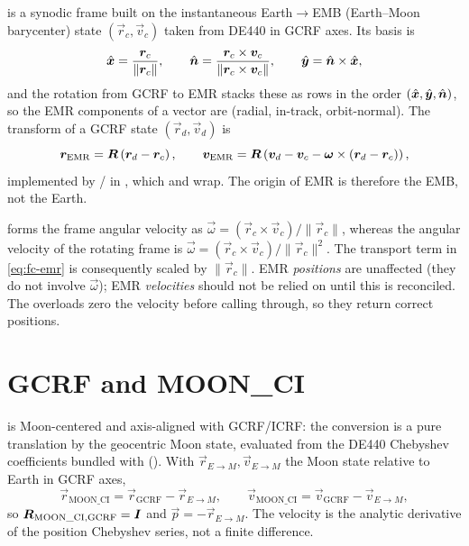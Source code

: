  is a synodic frame built on the instantaneous Earth$\to$EMB
(Earth--Moon barycenter) state $(\vec{r}_c, \vec{v}_c)$ taken from DE440 in
GCRF axes. Its basis is
%
\begin{equation}
  \label{eq:fc-emr-basis}
  \hat{\bm{x}} = \frac{\bm{r}_c}{\lVert\bm{r}_c\rVert},
  \qquad
  \hat{\bm{n}} = \frac{\bm{r}_c\times\bm{v}_c}{\lVert\bm{r}_c\times\bm{v}_c\rVert},
  \qquad
  \hat{\bm{y}} = \hat{\bm{n}}\times\hat{\bm{x}},
\end{equation}
%
and the rotation from GCRF to EMR stacks these as rows in the order
$(\hat{\bm{x}}, \hat{\bm{y}}, \hat{\bm{n}})$, so the EMR components of a vector are
(radial, in-track, orbit-normal). The transform of a GCRF state
$(\vec{r}_d,\vec{v}_d)$ is
%
\begin{equation}
  \label{eq:fc-emr}
  \bm{r}_{\mathrm{EMR}} = \bm{R}\left(\bm{r}_d - \bm{r}_c\right),
  \qquad
  \bm{v}_{\mathrm{EMR}} = \bm{R}\left(\bm{v}_d - \bm{v}_c
    - \bm{\omega}\times\left(\bm{r}_d - \bm{r}_c\right)\right),
\end{equation}
%
implemented by  / in
, which  and
 wrap. The origin of EMR is therefore the EMB, not the Earth.

\begin{lupntwarning}
   forms the frame angular velocity as
  $\vec{\omega} = (\vec{r}_c\times\vec{v}_c)/\lVert\vec{r}_c\rVert$, whereas
  the angular velocity of the rotating frame is
  $\vec{\omega} = (\vec{r}_c\times\vec{v}_c)/\lVert\vec{r}_c\rVert^2$. The
  transport term in \cref{eq:fc-emr} is consequently scaled by
  $\lVert\vec{r}_c\rVert$. EMR \emph{positions} are unaffected (they do not
  involve $\vec{\omega}$); EMR \emph{velocities} should not be relied on
  until this is reconciled. The  overloads zero the velocity
  before calling through, so they return correct positions.
\end{lupntwarning}

\section{GCRF and MOON\_CI}
\label{sec:fc-moonci}

 is Moon-centered and axis-aligned with GCRF/ICRF: the
conversion is a pure translation by the geocentric Moon state, evaluated
from the DE440 Chebyshev coefficients \citep{park2021de440} bundled with
\lupnt{} (). With
$\vec{r}_{E\to M}, \vec{v}_{E\to M}$ the Moon state relative to Earth in
GCRF axes,
%
\begin{equation}
  \label{eq:fc-moonci}
  \vec{r}_{\mathrm{MOON\_CI}} = \vec{r}_{\mathrm{GCRF}} - \vec{r}_{E\to M},
  \qquad
  \vec{v}_{\mathrm{MOON\_CI}} = \vec{v}_{\mathrm{GCRF}} - \vec{v}_{E\to M},
\end{equation}
%
so $\bm{R}_{\mathrm{MOON\_CI},\mathrm{GCRF}} = \bm{I}$ and
$\vec{p} = -\vec{r}_{E\to M}$. The velocity is the analytic derivative of
the position Chebyshev series, not a finite difference.

